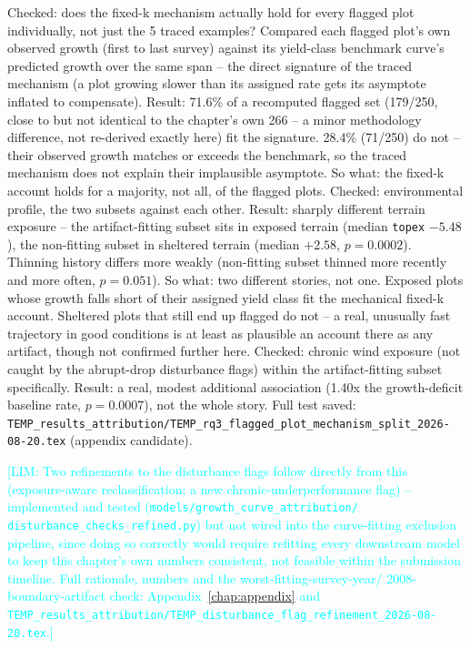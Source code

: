 \documentclass[logo,msc,ai]{infthesis}           %
\newcommand{\limit}[1]{\textcolor{cyan}{[LIM: #1]}}
\begin{document}
Checked: does the fixed-k mechanism actually hold for every flagged plot
individually, not just the 5 traced examples? Compared each flagged plot's own
observed growth (first to last survey) against its yield-class benchmark curve's
predicted growth over the same span -- the direct signature of the traced
mechanism (a plot growing slower than its assigned rate gets its asymptote
inflated to compensate).
Result: 71.6\% of a recomputed flagged set (179/250, close to but not identical to
the chapter's own 266 -- a minor methodology difference, not re-derived exactly
here) fit the signature. 28.4\% (71/250) do not -- their observed growth matches
or exceeds the benchmark, so the traced mechanism does not explain their
implausible asymptote.
So what: the fixed-k account holds for a majority, not all, of the flagged plots.
Checked: environmental profile, the two subsets against each other. Result:
sharply different terrain exposure -- the artifact-fitting subset sits in exposed
terrain (median \texttt{topex} $-5.48$), the non-fitting subset in sheltered
terrain (median $+2.58$, $p=0.0002$). Thinning history differs more weakly
(non-fitting subset thinned more recently and more often, $p=0.051$).
So what: two different stories, not one. Exposed plots whose growth falls short
of their assigned yield class fit the mechanical fixed-k account. Sheltered plots
that still end up flagged do not -- a real, unusually fast trajectory in good
conditions is at least as plausible an account there as any artifact, though not
confirmed further here.
Checked: chronic wind exposure (not caught by the abrupt-drop disturbance flags)
within the artifact-fitting subset specifically. Result: a real, modest
additional association (1.40x the growth-deficit baseline rate, $p=0.0007$), not
the whole story. Full test saved:
\texttt{TEMP\_results\_attribution/TEMP\_rq3\_flagged\_plot\_mechanism\_split\_2026-08-20.tex}
(appendix candidate).

\limit{Two refinements to the disturbance flags follow directly from this
(exposure-aware reclassification; a new chronic-underperformance flag) --
implemented and tested (\texttt{models/growth\_curve\_attribution/
disturbance\_checks\_refined.py}) but not wired into the curve-fitting exclusion
pipeline, since doing so correctly would require refitting every downstream
model to keep this chapter's own numbers consistent, not feasible within the
submission timeline. Full rationale, numbers and the worst-fitting-survey-year/
2008-boundary-artifact check: Appendix~\ref{chap:appendix} and
\texttt{TEMP\_results\_attribution/TEMP\_disturbance\_flag\_refinement\_2026-08-20.tex}.}
\end{document}
